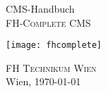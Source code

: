 %
%

\begin{titlepage}
\begin{center}
\vspace*{40mm} \huge CMS-Handbuch\\
\vspace*{10mm}
\large \textsc{FH-Complete CMS}

\vfill \texttt{[image: fhcomplete]}
	
\vfill \textsc{FH Technikum Wien}\\

Wien, \today
\end{center}
\end{titlepage}
